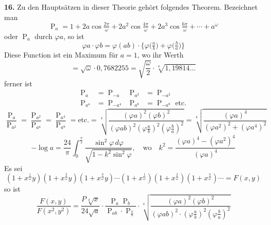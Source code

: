 \documentclass[10pt,a4paper]{article}
\newcommand{\s}[1]{\operatorname{#1}}
\begin{document}
\textbf{16.} Zu den Hauptsätzen in dieser Theorie gehört folgendes Theorem. Bezeichnet man
%
\begin{equation*}
\s{P}_a = 1 + 2a \cos\tfrac{2\pi}{\omega} + 2a^2 \cos\tfrac{4\pi}{\omega} + 2a^3 \cos\tfrac{6\pi}{\omega} + \cdots + a^{\omega}
\end{equation*}
%
oder $\s{P}_a$ durch $\varphi a$, so ist
%
\begin{equation*}
\varphi a \cdot \varphi b = \varphi(ab) \cdot \bigl\{\varphi\bigl(\tfrac{a}{b}\bigr) + \varphi\bigl(\tfrac{b}{a}\bigr)\bigr\}
\end{equation*}
%
Diese Function ist ein Maximum für $a = 1$, wo ihr Werth
%
\begin{equation*}
= \sqrt{\omega} \cdot 0{,}7682255 = \sqrt{\frac{\omega}{2}} \cdot \sqrt[4]{1{,}19814 \ldots}
\end{equation*}
%
ferner ist
%
\begin{align*}
\s{P}_a &= \s{P}_{-a} &
\s{P}_{a^2} &= \s{P}_{-a^2} \\
\s{P}_{a^4} &= \s{P}_{-a^4} &
\s{P}_{a^8} &= \s{P}_{-a^8} \text{ etc.}
\end{align*}
%
\begin{equation*}
\frac{\s{P}_a}{\s{P}_{a^2}} = \frac{\s{P}_{a^2}}{\s{P}_{a^4}} = \frac{\s{P}_{a^4}}{\s{P}_{a^8}} = \text{etc.} = \sqrt[4]{\frac{(\varphi a)^2 (\varphi b)^2}{(\varphi ab)^2 (\varphi\frac{a}{b})^2 (\varphi\frac{b}{a})^2}} = \sqrt[4]{\frac{(\varphi a)^4}{(\varphi a^2)^2 + (\varphi a^4)^2}}
\end{equation*}
%
\begin{equation*}
-\log a = \frac{24}{\pi} \int_0^{\frac{\pi}{2}} \frac{\sin^2\varphi \, d\varphi}{\sqrt{1 - k^2 \sin^2\varphi}}, \quad \text{wo} \quad k^2 = \frac{(\varphi a)^4 - (\varphi a^2)^4}{(\varphi a)^4}
\end{equation*}
%
Es sei
%
\begin{equation*}
(1 + x^{\frac{1}{\omega}}y)(1 + x^{\frac{2}{\omega}}y)(1 + x^{\frac{3}{\omega}}y) \cdots (1 + x^{\frac{1}{\omega}})(1 + x^{\frac{2}{\omega}})(1 + x^{\frac{3}{\omega}}) \cdots = F(x, y)
\end{equation*}
%
so ist
%
\begin{equation*}
\frac{F(x, y)}{F(x^2, y^2)} = \frac{P\sqrt[4]{x}}{24\sqrt{a}} \cdot \frac{\s{P}_a \s{P}_b}{\s{P}_{ab} \cdot \s{P}_{\frac{a}{b}}} \cdot \sqrt[4]{\frac{(\varphi a)^2 (\varphi b)^2}{(\varphi ab)^2 \cdot (\varphi\frac{a}{b})^2 (\varphi\frac{b}{a})^2}}
\end{equation*}
\end{document}
